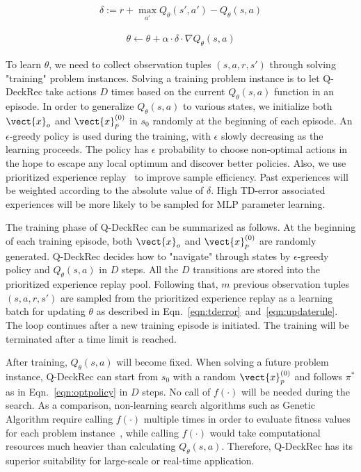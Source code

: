 \begin{align}
\delta := r + \max_{a'} Q_{\theta}(s', a') - Q_{\theta}(s,a)
\label{eqn:tderror}
\end{align}

\begin{align}
\theta \leftarrow \theta + \alpha \cdot \delta \cdot \nabla Q_\theta(s,a)
\label{eqn:updaterule}
\end{align}

To learn $\theta$, we need to collect  observation tuples $(s,a,r,s')$ through solving "training" problem instances. Solving a training problem instance is to let Q-DeckRec take actions $D$ times based on the current $Q_\theta(s,a)$ function in an episode. In order to generalize $Q_\theta(s,a)$ to various states, we initialize both $\vect{x}_o$ and $\vect{x}_p^{(0)}$ in $s_0$ randomly at the beginning of each episode. An $\epsilon$-greedy policy is used during the training, with $\epsilon$ slowly decreasing as the learning proceeds. The policy has $\epsilon$ probability to choose non-optimal actions in the hope to escape any local optimum and discover better policies. Also, we use prioritized experience replay~\cite{schaul2015prioritized} to improve sample efficiency. Past experiences will be weighted according to the absolute value of $\delta$. High TD-error associated experiences will be more likely to be sampled for MLP parameter learning. 

The training phase of Q-DeckRec can be summarized as follows. At the beginning of each training episode, both $\vect{x}_o$ and $\vect{x}_p^{(0)}$ are randomly generated. Q-DeckRec decides how to "navigate" through states by $\epsilon$-greedy policy and $Q_\theta(s,a)$ in $D$ steps. All the $D$ transitions are stored into the prioritized experience replay pool. Following that, $m$ previous observation tuples $(s, a, r, s')$ are sampled from the prioritized experience replay as a learning batch for updating $\theta$ as described in Eqn.~\ref{eqn:tderror}~and~\ref{eqn:updaterule}. The loop continues after a new training episode is initiated. The training will be terminated after a time limit is reached. 

After training, $Q_\theta(s,a)$ will become fixed. When solving a future problem instance, Q-DeckRec can start from $s_0$ with a random $\vect{x}_p^{(0)}$ and follows $\pi^*$ as in Eqn.~\ref{eqn:optpolicy} in $D$ steps. No call of $f(\cdot)$ will be needed during the search. As a comparison, non-learning search algorithms such as Genetic Algorithm require calling $f(
\cdot)$ multiple times in order to evaluate fitness values for each problem instance~\cite{garcia2016evolutionary,bjorke2017deckbuilding}, while calling $f(\cdot)$ would take computational resources much heavier than calculating $Q_\theta(s,a)$. Therefore, Q-DeckRec has its superior suitability for large-scale or real-time application.








